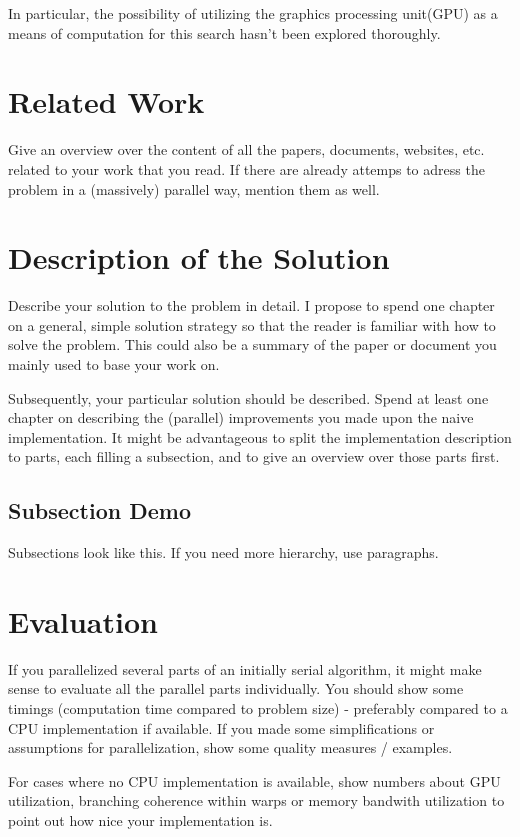 \documentclass{utue} %
\begin{document}
In particular, the possibility of utilizing the graphics processing unit(GPU) as a means of computation for this search hasn't been explored thoroughly.
\section{Related Work} 

Give an overview over the content of all the papers, documents, websites, etc. related to your work that you read. If there are already attemps to adress the problem in a (massively) parallel way, mention them as well.


\section{Description of the Solution}

Describe your solution to the problem in detail. I propose to spend one chapter on a general, simple solution strategy so that the reader is familiar with how to solve the problem. This could also be a summary of the paper or document you mainly used to base your work on.

Subsequently, your particular solution should be described. Spend at least one chapter on describing the (parallel) improvements you made upon the naive implementation. It might be advantageous to split the implementation description to parts, each filling a subsection, and to give an overview over those parts first.

\subsection{Subsection Demo}

Subsections look like this. If you need more hierarchy, use paragraphs.


\section{Evaluation}

If you parallelized several parts of an initially serial algorithm, it might make sense to evaluate all the parallel parts individually. You should show some timings (computation time compared to problem size) - preferably compared to a CPU implementation if available.  If you made some simplifications or assumptions for parallelization, show some quality measures / examples.

For cases where no CPU implementation is available, show numbers about GPU utilization, branching coherence within warps or memory bandwith utilization to point out how nice your implementation is.
\end{document}
